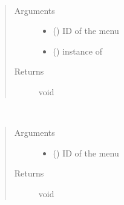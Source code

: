 \documentclass[a4paper,12pt,english]{sphinxmanual}
\begin{document}
\begin{fulllineitems}
~\begin{quote}\begin{description}
\item[{Arguments}] \leavevmode\begin{itemize}
\item {} 
 () \textendash{} ID of the menu

\item {} 
 () \textendash{}  instance of 

\end{itemize}

\item[{Returns}] \leavevmode
void

\end{description}\end{quote}

\end{fulllineitems}



\begin{fulllineitems}
\label{\detokenize{viewer/parameters:BIMDataViewer.removeCustomButtonMenu}}~\begin{quote}\begin{description}
\item[{Arguments}] \leavevmode\begin{itemize}
\item {} 
 () \textendash{} ID of the menu

\end{itemize}

\item[{Returns}] \leavevmode
void

\end{description}\end{quote}

\end{fulllineitems}
\end{document}
